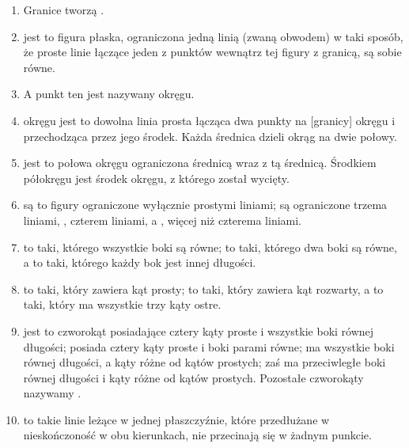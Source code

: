 \documentclass[12pt, a4paper]{article}
\begin{document}
\begin{enumerate}
    \item \mkdef Granice tworzą .
    \item \mkdef
         jest to figura płaska, ograniczona jedną linią (zwaną
        obwodem) w taki sposób, że proste linie łączące jeden z punktów wewnątrz
        tej figury z granicą, są sobie równe.
    \item \mkdef A punkt ten jest nazywany  okręgu.
    \item \mkdef
         okręgu jest to dowolna linia prosta łącząca dwa punkty
        na [granicy] okręgu i przechodząca przez jego środek. Każda średnica
        dzieli okrąg na dwie połowy.
    \item \mkdef
         jest to połowa okręgu ograniczona średnicą wraz z tą
        średnicą. Środkiem półokręgu jest środek okręgu, z którego został
        wycięty.
    \item \mkdef
         są to figury ograniczone wyłącznie
        prostymi liniami;  są ograniczone trzema liniami,
        , czterem liniami, a , więcej niż
        czterema liniami.
    \item \mkdef
         to taki, którego wszystkie boki są równe;
         to taki, którego dwa boki są równe,
        a  to taki, którego każdy bok jest innej długości.
    \item \mkdef
         to taki, który zawiera kąt prosty;
         to taki, który zawiera kąt rozwarty,
        a  to taki, który ma wszystkie trzy kąty ostre.
    \item \mkdef
         jest to czworokąt posiadające cztery kąty proste
        i wszystkie boki równej długości;  posiada cztery
        kąty proste i boki parami równe;  ma wszystkie boki równej
        długości, a kąty różne od kątów prostych;  zaś
        ma przeciwległe boki równej długości i kąty różne od kątów prostych.
        Pozostałe czworokąty nazywamy .
    \item \mkdef
         to takie linie leżące w jednej płaszczyźnie,
        które przedłużane w nieskończoność w obu kierunkach, nie przecinają
        się w żadnym punkcie.
\end{enumerate}
\end{document}
